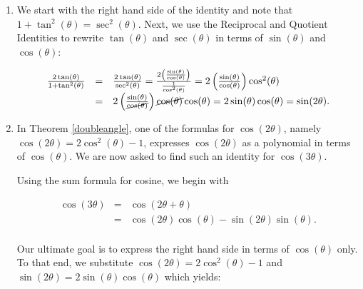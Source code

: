 \documentclass{ximera}
\begin{document}
\begin{example}
\begin{enumerate}
 

Our final answer is  $\sin(2\theta) = 2 \sin(\theta) \cos(\theta) = 2x\sqrt{1-x^2}$.

\item  We start with the right hand side of the identity and note that $1 + \tan^{2}(\theta) = \sec^{2}(\theta)$.  Next,  we use the Reciprocal and Quotient Identities to rewrite $\tan(\theta)$ and $\sec(\theta)$ in terms of $\sin(\theta)$ and $\cos(\theta)$:

\vspace{-.15in}

\[ \begin{array}{rcl}

 \frac{2\tan(\theta)}{1 + \tan^{2}(\theta)} & = &  \frac{2\tan(\theta)}{\sec^{2}(\theta)}=  \frac{2 \left(  \frac{\sin(\theta)}{\cos(\theta)}\right)}{ \frac{1}{\cos^{2}(\theta)}}= 2\left(  \frac{\sin(\theta)}{\cos(\theta)}\right) \cos^{2}(\theta) \\  
																						& = & 2\left(  \frac{\sin(\theta)}{\cancel{\cos(\theta)}}\right) \cancel{\cos(\theta)} \cos(\theta) = 2\sin(\theta) \cos(\theta) = \sin(2\theta).\\ 

\end{array} \]

\item In Theorem \ref{doubleangle}, one of the formulas for $\cos(2\theta)$, namely $\cos(2\theta) = 2\cos^{2}(\theta) - 1$, expresses $\cos(2\theta)$ as a polynomial in terms of $\cos(\theta)$.  We are  now asked to find such an  identity for $\cos(3\theta)$.  

 

Using the sum formula for cosine, we begin with 



\[ \begin{array}{rcl}

\cos(3\theta) & = & \cos(2\theta + \theta) \\  
              & = & \cos(2\theta)\cos(\theta) - \sin(2\theta)\sin(\theta). \\
\end{array}\]

Our ultimate goal is to express the right hand side in terms of $\cos(\theta)$ only.  To that end, we  substitute $\cos(2\theta) = 2\cos^{2}(\theta) -1$ and $\sin(2\theta) = 2\sin(\theta)\cos(\theta)$ which yields:

\vspace{-.1in}


\end{enumerate}
\end{example}
\end{document}
